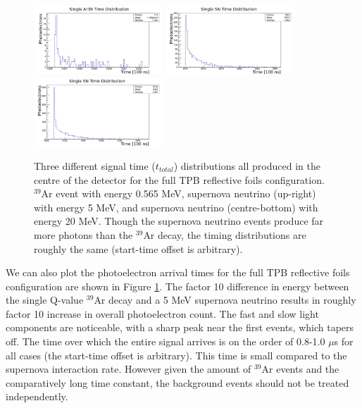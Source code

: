 \documentclass[a4paper]{article}
\begin{document}
\begin{figure}[H]
\center
  \includegraphics[width=0.43\textwidth]{single_maxE_middetector_ar_time_distribution_ff_labels.pdf}
  \includegraphics[width=0.43\textwidth]{single_5mev_middetector_sn_time_distribution_ff_labels.pdf}
  \includegraphics[width=0.43\textwidth]{single_20mev_middetector_sn_time_distribution_ff_labels.pdf}
\caption{Three different signal time ($t_{total}$) distributions all produced in the centre of the detector for the full TPB reflective foils configuration. $^{39}$Ar event with energy 0.565 MeV, supernova neutrino (up-right) with energy 5 MeV, and supernova neutrino (centre-bottom) with energy 20 MeV. Though the supernova neutrino events produce far more photons than the $^{39}$Ar decay, the timing distributions are roughly the same (start-time offset is arbitrary).}\label{single_events_timing}
\end{figure}

We can also plot the photoelectron arrival times for the full TPB reflective foils configuration are shown in Figure \ref{single_events_timing}. The factor 10 difference in energy between the single Q-value $^{39}$Ar decay and a 5 MeV supernova neutrino results in roughly factor 10 increase in overall photoelectron count. The fast and slow light components are noticeable, with a sharp peak near the first events, which tapers off. The time over which the entire signal arrives is on the order of 0.8-1.0 $\mu$s for all cases (the start-time offset is arbitrary). This time is small compared to the supernova interaction rate. However given the amount of $^{39}$Ar events and the comparatively long time constant, the background events should not be treated independently.
\end{document}
